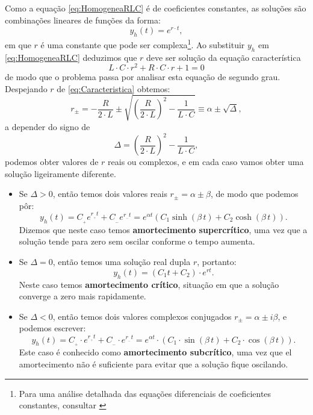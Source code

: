Como a equação \eqref{eq:HomogeneaRLC} é de coeficientes constantes,
as soluções são combinações lineares de funções da forma:
\[
y_h(t) = e^{r\cdot t},
\]
em que $r$ é uma constante que pode ser complexa\footnote{Para uma
  análise detalhada das equações diferenciais de coeficientes
  constantes, consultar \cite[p.~226]{DiPrima}}. Ao substituir $y_h$
em \eqref{eq:HomogeneaRLC} deduzimos que $r$ deve ser solução da
equação característica
\begin{equation}
  \label{eq:Caracteristica}
  L\cdot C\cdot r^2 + R\cdot C\cdot r + 1 = 0
\end{equation}
de modo que o problema passa por analisar esta equação de segundo
grau. Despejando $r$ de \eqref{eq:Caracteristica} obtemos:
\[
r_\pm = -\frac{R}{2\cdot L} \pm \sqrt{\left( \frac{R}{2\cdot L} \right)^2 - \frac{1}{L\cdot C}} \equiv \alpha \pm \sqrt{\Delta},
\]
a depender do signo de
\[
\Delta = \left( \frac{R}{2\cdot L} \right)^2 - \frac{1}{L\cdot C},
\]
podemos obter valores de $r$ reais ou complexos, e em cada caso vamos
obter uma solução ligeiramente diferente.
\begin{itemize}
\item Se $\Delta > 0$, então temos dois valores reais $r_{\pm}=\alpha
  \pm \beta $, de modo que podemos pôr:
\[
y_h(t) = C_{\!_+} e^{r_{\!_+} t} + C_{\!_-} e^{r_{\!_-}t} = e^{\alpha
  t}\left(C_1\sinh(\beta\, t) + C_2 \cosh(\beta\, t)\right).
\]
Dizemos que neste caso temos \textbf{amortecimento supercrítico}, uma
vez que a solução tende para zero sem oscilar conforme o tempo
aumenta.
  \item Se $\Delta = 0$, então temos uma solução real dupla $r$, portanto:
\[
y_h(t) = (C_1t+C_2)\cdot e^{rt}.
\]
Neste caso temos \textbf{amortecimento crítico}, situação em que a
solução converge a zero mais rapidamente.
  \item Se $\Delta < 0$, então temos dois valores complexos conjugados $r_{\pm}=\alpha \pm i\beta$, e podemos escrever:
\[
y_h(t) = C_{\!_+} \cdot e^{r_{\!_+}  t} + C_{\!_-}\cdot  e^{r_{\!_-} t} = e^{\alpha t}\cdot \left(C_1\cdot \sin(\beta\, t) + C_2 \cdot \cos(\beta\, t)\right).
\]
Este caso é conhecido como \textbf{amortecimento subcrítico}, uma vez
que el amortecimento não é suficiente para evitar que a solução fique
oscilando.
\end{itemize}
